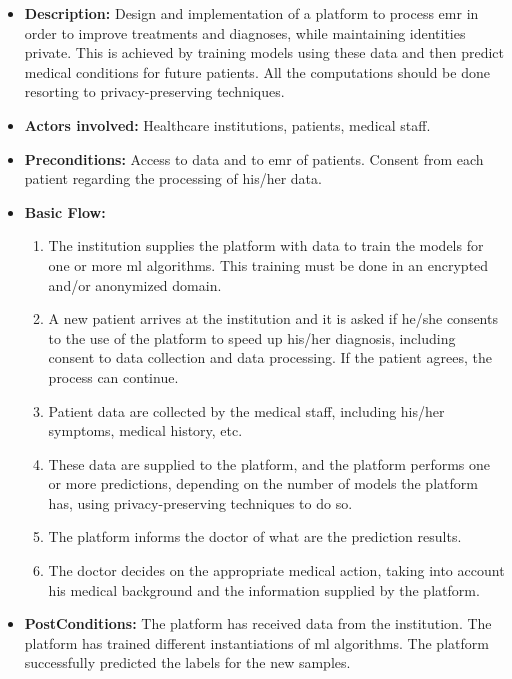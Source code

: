 \begin{itemize}
	

	\item \textbf{Description:} Design and implementation of a platform to process \ac{emr} in order to improve treatments and diagnoses, while maintaining identities private. This is achieved by training models using these data and then predict medical conditions for future patients. All the computations should be done resorting to privacy-preserving techniques.

	\item \textbf{Actors involved:} Healthcare institutions, patients, medical staff.

	\item \textbf{Preconditions:} Access to data and to \ac{emr} of patients. Consent from each patient regarding the processing of his/her data.

	\item \textbf{Basic Flow:} 
	
	\begin{enumerate}
		\item The institution supplies the platform with data to train the models for one or more \ac{ml} algorithms. This training must be done in an encrypted and/or anonymized domain.

		\item A new patient arrives at the institution and it is asked if he/she consents to the use of the platform to speed up his/her diagnosis, including consent to data collection and data processing. If the patient agrees, the process can continue.

		\item Patient data are collected by the medical staff, including his/her symptoms, medical history, etc.

		\item These data are supplied to the platform, and the platform performs one or more predictions, depending on the number of models the platform has, using privacy-preserving techniques to do so.

		\item The platform informs the doctor of what are the prediction results.

		\item The doctor decides on the appropriate medical action, taking into account his medical background and the information supplied by the platform.


	\end{enumerate}

	\item \textbf{PostConditions:} The platform has received data from the institution. The platform has trained different instantiations of \ac{ml} algorithms. The platform successfully predicted the labels for the new samples.

\end{itemize}





